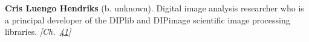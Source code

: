 \textbf{Cris Luengo Hendriks} (b. unknown). Digital image analysis researcher who is a principal developer of the DIPlib and DIPimage scientific image processing libraries. \emph{[Ch.~\hyperref[ch:hough]{41}]}

